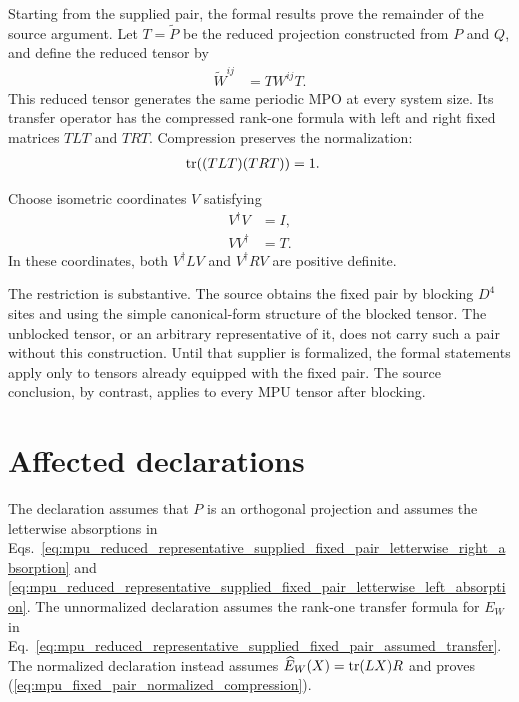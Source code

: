 \documentclass{article}
\begin{document}
Starting from the supplied pair, the formal results prove the remainder of the
source argument. Let $T=\widetilde P$ be the reduced projection constructed
from $P$ and $Q$, and define the reduced tensor by
\begin{align}
    \widetilde W^{ij} &= TW^{ij}T.
    \label{eq:mpu_reduced_representative_supplied_fixed_pair_reduced_tensor}
\end{align}
This reduced tensor generates the same periodic MPO at every system size. Its
transfer operator has the compressed rank-one formula with left and right
fixed matrices $TLT$ and $TRT$. Compression preserves the normalization:
\begin{align}
    \operatorname{tr}\!\left((TLT)(TRT)\right) &= 1.
    \label{eq:mpu_reduced_representative_supplied_fixed_pair_compressed_normalization}
\end{align}

Choose isometric coordinates $V$ satisfying
\begin{align}
    V^\dagger V &= I,
    \label{eq:mpu_reduced_representative_supplied_fixed_pair_isometry}\\
    VV^\dagger &= T.
    \label{eq:mpu_reduced_representative_supplied_fixed_pair_isometry_range}
\end{align}
In these coordinates, both $V^\dagger LV$ and $V^\dagger RV$ are positive
definite.

The restriction is substantive. The source obtains the fixed pair by blocking
$D^4$ sites and using the simple canonical-form structure of the blocked
tensor. The unblocked tensor, or an arbitrary representative of it, does not
carry such a pair without this construction. Until that supplier is
formalized, the formal statements apply only to tensors already equipped with
the fixed pair. The source conclusion, by contrast, applies to every MPU tensor
after blocking.

\section{Affected declarations}

The declaration
 assumes that $P$ is
an orthogonal projection and assumes the letterwise absorptions in
Eqs.~\ref{eq:mpu_reduced_representative_supplied_fixed_pair_letterwise_right_absorption}
and
\ref{eq:mpu_reduced_representative_supplied_fixed_pair_letterwise_left_absorption}.
The unnormalized declaration
 assumes the
rank-one transfer formula for $E_W$ in
Eq.~\ref{eq:mpu_reduced_representative_supplied_fixed_pair_assumed_transfer}.
The normalized declaration instead assumes
$\widehat E_W(X)=\operatorname{tr}(LX)R$ and proves
(\ref{eq:mpu_fixed_pair_normalized_compression}).
\end{document}
